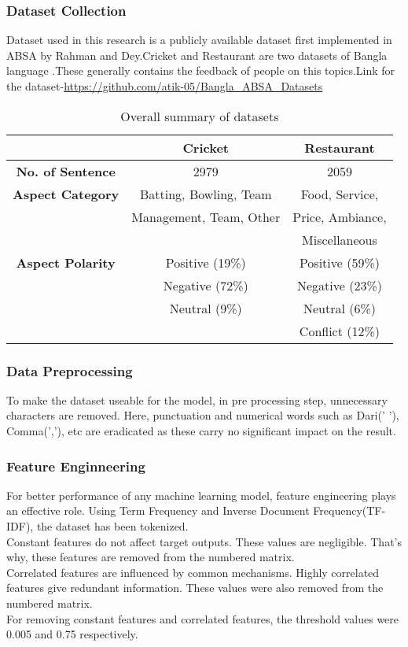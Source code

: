 \documentclass[a4paper,12pt]{article}
\begin{document}
\subsubsection{Dataset Collection}
Dataset used in this research is a publicly available dataset first implemented in ABSA by Rahman and Dey\cite{rahman2018datasets}.Cricket and Restaurant are two datasets of Bangla language .These generally contains the feedback of people on this topics.Link for the dataset-\url{https://github.com/atik-05/Bangla_ABSA_Datasets}
\newpage
\begin{table}[h!]
    \centering
    \caption{Overall summary of datasets}
    \vspace{0.5cm}
    \begin{tabular}{|c|c|c|}
        \hline
        & \textbf{Cricket} & \textbf{Restaurant} \\
        \hline
        \textbf{No. of Sentence} & 2979 & 2059 \\
        \hline
        \textbf{Aspect Category} & Batting, Bowling, Team & Food, Service, \\
                                 & Management, Team, Other & Price, Ambiance, \\
                                 & & Miscellaneous \\
        \hline
        \textbf{Aspect Polarity} & Positive (19\%) & Positive (59\%) \\
                                 & Negative (72\%) & Negative (23\%) \\
                                 & Neutral (9\%) & Neutral (6\%) \\
                                 & & Conflict (12\%) \\
        \hline
    \end{tabular}
\end{table}
\subsubsection{Data Preprocessing}
To make the dataset useable for the model, in pre processing step, unnecessary characters are removed. Here, punctuation and numerical words such as Dari(' \textbar '), Comma(','), etc are eradicated as these carry no significant impact on the result.
\subsubsection{Feature Enginneering}
For better performance of any machine learning model, feature engineering plays an effective role. Using Term Frequency and Inverse Document Frequency(TF-IDF), the dataset has been tokenized.\\
Constant features do not affect target outputs. These values are negligible. That's why, these features are removed from the numbered matrix.\\
Correlated features are influenced by common mechanisms. Highly correlated features give redundant information. These values were also removed from the numbered matrix.\\
For removing constant features and correlated features, the threshold values were 0.005 and 0.75 respectively.
\end{document}
